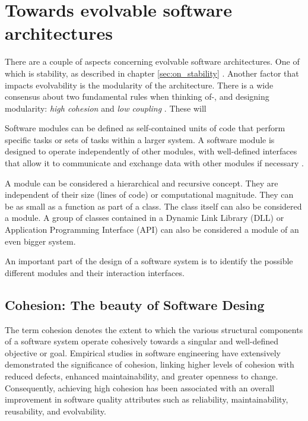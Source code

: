 \section{Towards evolvable software architectures} \label{sec:on_modules}

There are a couple of aspects concerning evolvable software architectures. One of which is
stability, as described in chapter \ref{sec:on_stability} .
Another factor that impacts evolvability is the modularity of the architecture. There is a
wide consensus about two fundamental rules when thinking of-, and designing modularity:
\emph{high cohesion} and \emph{low coupling} \autocite[22]{mannaert_normalized_2016}.
These will

Software modules can be defined as self-contained units of code that perform specific
tasks or sets of tasks within a larger system. A software module is designed to operate
independently of other modules, with well-defined interfaces that allow it to communicate
and exchange data with other modules if necessary \autocite[22]{mannaert_normalized_2016}.

A module can be considered a hierarchical and recursive concept. They are independent of
their size (lines of code) or computational magnitude. They can be as small as a function
as part of a class. The class itself can also be considered a module. A group of classes
contained in a Dynamic Link Library (DLL) or Application Programming Interface (API) can
also be considered a module of an even bigger system. 

An important part of the design of a software system is to identify the possible different
modules and their interaction interfaces.

\subsection{Cohesion: The beauty of Software Desing} \label{subsec:on_modularity}

The term cohesion denotes the extent to which the various structural components of a
software system operate cohesively towards a singular and well-defined objective or goal.
Empirical studies in software engineering have extensively demonstrated the significance
of cohesion, linking higher levels of cohesion with reduced defects, enhanced
maintainability, and greater openness to change. Consequently, achieving high cohesion has
been associated with an overall improvement in software quality attributes such as
reliability, maintainability, reusability, and evolvability.

